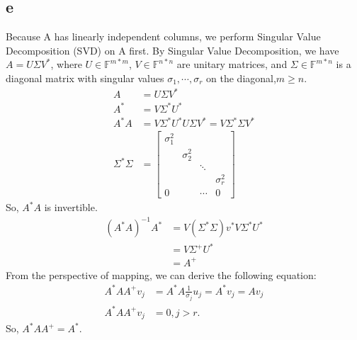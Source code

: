 \documentclass[a4paper]{article}
\begin{document}
\subsection*{e}
Because A has linearly independent columns, we perform Singular Value Decomposition (SVD) on A first.
By Singular Value Decomposition, we have $A = U\Sigma V^*$, where $U \in \mathbb{F}^{m * m}$, $V \in \mathbb{F}^{n * n}$ are unitary matrices, and $\Sigma \in \mathbb{F}^{m * n}$ is a diagonal matrix with singular values $\sigma_1, \cdots, \sigma_r$ on the diagonal,$m\geqslant n$. 
\begin{align*}
  A &= U\Sigma V^* \\
  A^*&=V\Sigma^*U^* \\
  A^*A&=V\Sigma^*U^*U\Sigma V^*=V\Sigma^*\Sigma V^*\\
  \Sigma^*\Sigma &= \begin{bmatrix}
                    \sigma_1^2 & & & \\
                    & \sigma_2^2 & & \\
                    & & \ddots & \\
                    & & & \sigma_r^2\\
                    0 & &\cdots & 0
                  \end{bmatrix}
\end{align*}
So, $A^*A$ is invertible.
\begin{align*}
  (A^*A)^{-1}A^* &= V(\Sigma^*\Sigma)v^*V\Sigma^*U^* \\
  &= V\Sigma^+U^* \\
  &= A^+
\end{align*}
From the perspective of mapping, we can derive the following equation:
\begin{align*}
  A^*AA^+v_j &= A^*A\frac{1}{\sigma_j}u_j = A^*v_j = A v_j\\
  A^*AA^+v_j &= 0 , j>r.
\end{align*}
So, $A^*AA^+ = A^*$.
\end{document}
